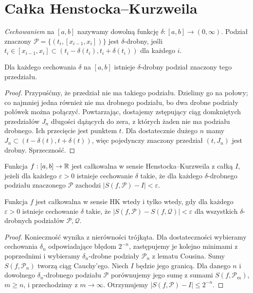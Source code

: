 \section{Całka Henstocka--Kurzweila}
\begin{definicja}
\emph{Cechowaniem} na $[a,b]$ nazywamy dowolną funkcję $\delta:[a,b]\to(0,\infty)$. Podział znaczony $\mathcal P=\{(t_i,[x_{i-1},x_i])\}$ jest $\delta$-drobny, jeśli $t_i\in[x_{i-1},x_i]\subset(t_i-\delta(t_i),t_i+\delta(t_i))$ dla każdego $i$.
\end{definicja}
\begin{lemat}[Cousina]
Dla każdego cechowania $\delta$ na $[a,b]$ istnieje $\delta$-drobny podział znaczony tego przedziału.
\end{lemat}
\begin{proof}
Przypuśćmy, że przedział nie ma takiego podziału. Dzielimy go na połowy; co najmniej jedna również nie ma drobnego podziału, bo dwa drobne podziały połówek można połączyć. Powtarzając, dostajemy zstępujący ciąg domkniętych przedziałów $J_n$ długości dążących do zera, z których żaden nie ma podziału drobnego. Ich przecięcie jest punktem $t$. Dla dostatecznie dużego $n$ mamy $J_n\subset(t-\delta(t),t+\delta(t))$, więc pojedynczy znaczony przedział $(t,J_n)$ jest drobny. Sprzeczność.
\end{proof}
\begin{definicja}
Funkcja $f:[a,b]\to\mathbb R$ jest całkowalna w sensie Henstocka--Kurzweila z całką $I$, jeżeli dla każdego $\varepsilon>0$ istnieje cechowanie $\delta$ takie, że dla każdego $\delta$-drobnego podziału znaczonego $\mathcal P$ zachodzi $|S(f,\mathcal P)-I|<\varepsilon$.
\end{definicja}
\begin{twierdzenie}
Funkcja $f$ jest całkowalna w sensie HK wtedy i tylko wtedy, gdy dla każdego $\varepsilon>0$ istnieje cechowanie $\delta$ takie, że $|S(f,\mathcal P)-S(f,\mathcal Q)|<\varepsilon$ dla wszystkich $\delta$-drobnych podziałów $\mathcal P,\mathcal Q$.
\end{twierdzenie}
\begin{proof}
Konieczność wynika z nierówności trójkąta. Dla dostateczności wybieramy cechowania $\delta_n$ odpowiadające błędom $2^{-n}$, zastępujemy je kolejno minimami z poprzednimi i wybieramy $\delta_n$-drobne podziały $\mathcal P_n$ z lematu Cousina. Sumy $S(f,\mathcal P_n)$ tworzą ciąg Cauchy'ego. Niech $I$ będzie jego granicą. Dla danego $n$ i dowolnego $\delta_n$-drobnego podziału $\mathcal P$ porównujemy jego sumę z sumami $S(f,\mathcal P_m)$, $m\ge n$, i przechodzimy z $m\to\infty$. Otrzymujemy $|S(f,\mathcal P)-I|\le2^{-n}$.
\end{proof}
